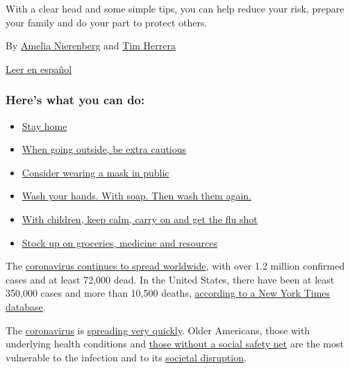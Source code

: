 With a clear head and some simple tips, you can help reduce your risk,
prepare your family and do your part to protect others.

By \href{https://www.nytimes3xbfgragh.onion/by/amelia-nierenberg}{Amelia
Nierenberg} and
\href{https://www.nytimes3xbfgragh.onion/by/tim-herrera}{Tim Herrera}

\href{https://www.nytimes3xbfgragh.onion/es/article/el-coronavirus-proteger-preparar.html}{Leer
en español}

\hypertarget{heres-what-you-can-do}{%
\subsubsection{Here's what you can do:}\label{heres-what-you-can-do}}

\begin{itemize}
\tightlist
\item
  \protect\hyperlink{link-5b4d0175}{Stay home}
\item
  \protect\hyperlink{link-7e8a3c72}{When going outside, be extra
  cautious}
\item
  \protect\hyperlink{link-2963e7f4}{Consider wearing a mask in public}
\item
  \protect\hyperlink{link-364448a4}{Wash your hands. With soap. Then
  wash them again.}
\item
  \protect\hyperlink{link-4b7fc30f}{With children, keep calm, carry on
  and get the flu shot}
\item
  \protect\hyperlink{link-385f8aea}{Stock up on groceries, medicine and
  resources}
\end{itemize}

The
\href{https://www.nytimes3xbfgragh.onion/news-event/coronavirus}{coronavirus
continues to spread worldwide}, with over 1.2 million confirmed cases
and at least 72,000 dead. In the United States, there have been at least
350,000 cases and more than 10,500 deaths,
\href{https://www.nytimes3xbfgragh.onion/interactive/2020/world/coronavirus-maps.html?action=click\&module=RelatedLinks\&pgtype=Article}{according
to a New York Times database}.

The
\href{https://www.nytimes3xbfgragh.onion/2020/04/03/technology/coronavirus-masks-shortage.html}{coronavirus}
is
\href{https://www.nytimes3xbfgragh.onion/interactive/2020/world/asia/china-coronavirus-contain.html}{spreading
very quickly}. Older Americans, those with underlying health conditions
and
\href{https://www.nytimes3xbfgragh.onion/2020/03/10/us/coronavirus-homeless.html?smtyp=cur\&smid=tw-nytimes}{those
without a social safety net} are the most vulnerable to the infection
and to its
\href{https://www.nytimes3xbfgragh.onion/live/2020/coronavirus-usa-03-16}{societal
disruption}.

